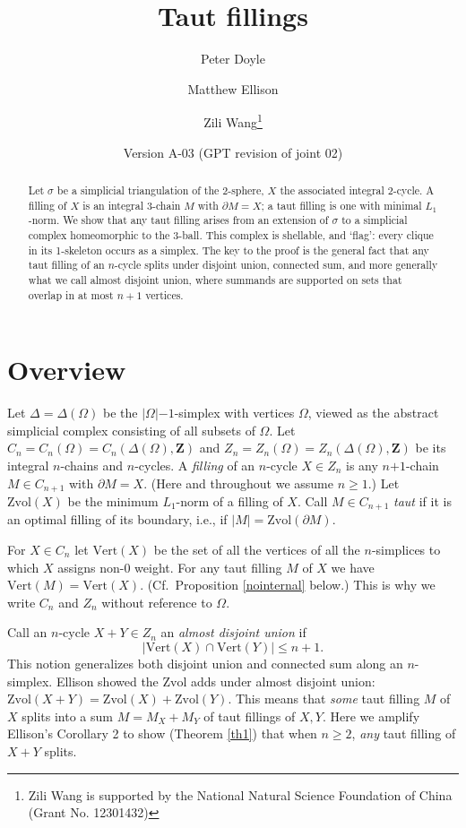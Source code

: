 \documentclass[12pt]{article}
\title{Taut fillings}
\author{Peter Doyle \and Matthew Ellison \and Zili Wang\thanks{
Zili Wang is supported by
the National Natural Science Foundation of China (Grant No. 12301432)
}}
\date{Version A-03 (GPT revision of joint 02)}
\def\ZZ{\mathbf{Z}}
\def\del{\partial}
\newcommand{\kw}{\mathrm}
\newcommand{\vertices}{\kw{Vert}}
\newcommand{\Zvol}{\kw{Zvol}}
\newcommand{\pls}{\mathord{+}}
\newcommand{\mns}{\mathord{-}}
\begin{document}
\maketitle

\begin{abstract}
Let $\sigma$ be a simplicial triangulation of the 2-sphere,
$X$ the associated integral 2-cycle.
A filling of $X$ is an integral 3-chain $M$
with $\del M = X$;
a taut filling is one with minimal $L_1$-norm.
We show that any taut filling 
arises from an extension of $\sigma$ to
a simplicial complex homeomorphic to the 3-ball.
This complex is shellable, and `flag':
every clique in its 1-skeleton occurs as a simplex.
The key to the proof is the general
fact that any taut filling of an $n$-cycle
splits under disjoint union, connected sum, and more generally
what we call almost disjoint union,
where summands are supported on sets that overlap in at most $n+1$ vertices.
\end{abstract}

\section{Overview}
Let $\Delta = \Delta(\Omega)$ be the $|\Omega|\mns 1$-simplex
with vertices $\Omega$,
viewed as the abstract simplicial complex consisting of all subsets of
$\Omega$.
Let $C_n=C_n(\Omega)=C_n(\Delta(\Omega),\ZZ)$
and $Z_n=Z_n(\Omega)=Z_n(\Delta(\Omega),\ZZ)$
be its integral $n$-chains and $n$-cycles.
A \emph{filling} of an $n$-cycle $X \in Z_n$ is any
$n\pls 1$-chain $M \in C_{n+1}$ with $\del M = X$.
(Here and throughout we assume $n\geq 1$.)
Let $\Zvol(X)$ be the minimum $L_1$-norm of a filling of $X$.
Call $M \in C_{n+1}$ \emph{taut} if it is an optimal filling
of its boundary, i.e., if $|M|=\Zvol(\del M)$.

For $X \in C_n$ let
$\vertices(X)$ be the set of all the vertices of all the $n$-simplices
to which $X$ assigns non-$0$ weight.
For any taut filling $M$ of $X$ we have $\vertices(M) = \vertices(X)$.
(Cf.\ Proposition \ref{nointernal} below.)
This is why we write $C_n$ and $Z_n$ without reference to $\Omega$.

Call an $n$-cycle $X+Y \in Z_n$ an \emph{almost disjoint union} if
\[
|\vertices(X) \cap \vertices(Y)| \leq n+1
.
\]
This notion generalizes both disjoint union and connected sum
along an $n$-simplex.
Ellison \cite{ellison:gap}
showed the $\Zvol$ adds under almost disjoint union:
$\Zvol(X+Y) = \Zvol(X) + \Zvol(Y)$.
This means that \emph{some} taut filling $M$ of $X$ splits into a sum
$M=M_X+M_Y$ of taut fillings of $X,Y$.
Here we amplify Ellison's Corollary 2 to show (Theorem \ref{th1})
that when $n \geq 2$, \emph{any} taut filling of $X+Y$ splits.
\end{document}
